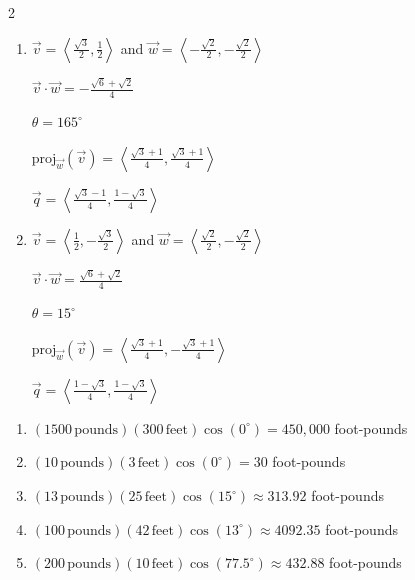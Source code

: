 \documentclass{ximera}
\begin{document}
\begin{multicols}{2} \raggedcolumns 
\begin{enumerate}
\setcounter{enumi}{\value{HW}}

\item $\overrightarrow{v} = \left\langle \frac{\sqrt{3}}{2}, \frac{1}{2} \right\rangle$ and $\overrightarrow{w} = \left\langle -\frac{\sqrt{2}}{2}, -\frac{\sqrt{2}}{2} \right\rangle$

 $\overrightarrow{v} \cdot \overrightarrow{w} = -\frac{\sqrt{6} + \sqrt{2}}{4}$

 $\theta = 165^{\circ}$ 

 $\text{proj}_{\overrightarrow{w}}(\overrightarrow{v}) = \left\langle \frac{\sqrt{3} + 1}{4}, \frac{\sqrt{3} + 1}{4} \right\rangle$

 $\overrightarrow{q} = \left\langle \frac{\sqrt{3} - 1}{4}, \frac{1 - \sqrt{3}}{4} \right\rangle$
 \vfill
 
\item $\overrightarrow{v} = \left\langle \frac{1}{2}, -\frac{\sqrt{3}}{2} \right\rangle$ and $\overrightarrow{w} = \left\langle \frac{\sqrt{2}}{2}, -\frac{\sqrt{2}}{2} \right\rangle$

 $\overrightarrow{v} \cdot \overrightarrow{w} = \frac{\sqrt{6} + \sqrt{2}}{4}$

 $\theta  = 15^{\circ}$ 

 $\text{proj}_{\overrightarrow{w}}(\overrightarrow{v}) = \left\langle \frac{\sqrt{3} + 1}{4}, -\frac{\sqrt{3} + 1}{4} \right\rangle$

 $\overrightarrow{q} = \left\langle \frac{1 - \sqrt{3}}{4}, \frac{1 - \sqrt{3}}{4} \right\rangle$

\setcounter{HW}{\value{enumi}}
\end{enumerate}
\end{multicols}


\begin{enumerate}
\setcounter{enumi}{\value{HW}}

\item  $(1500 \, \text{pounds})(300 \, \text{feet})\cos\left(0^{\circ}\right) =  450,000$ foot-pounds

\item $(10 \, \text{pounds})(3 \, \text{feet})\cos\left(0^{\circ}\right) =  30$ foot-pounds

\item $(13 \, \text{pounds})(25 \, \text{feet}) \cos\left(15^{\circ}\right) \approx 313.92$ foot-pounds

\item $(100 \, \text{pounds})(42 \, \text{feet}) \cos\left(13^{\circ}\right) \approx 4092.35$ foot-pounds

\item $(200 \, \text{pounds})(10 \, \text{feet}) \cos\left(77.5^{\circ}\right) \approx 432.88$ foot-pounds

\end{enumerate}
\end{document}
